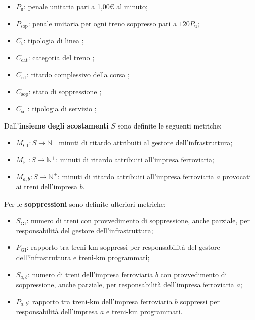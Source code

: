 \documentclass[12pt,italian]{report}
\begin{document}
\begin{itemize}
	\item $P_\text{u}$: penale unitaria pari a 1,00€ al minuto;
	\item $P_\text{sop}$: penale unitaria per ogni treno soppresso
    pari a $120 P_\text{u}$;
	\item $C_\text{t}$: tipologia di linea \cite[app.\ 5C, tabella
    1]{RfiPir};
	\item $C_\text{cat}$: categoria del treno \cite[app.\ 5C, tabella
    4]{RfiPir};
	\item $C_\text{rit}$: ritardo complessivo della corsa \cite[app.\
    5C, tabelle 2a, 2b, 2c]{RfiPir};
	\item $C_\text{sop}$: stato di soppressione \cite[app.\ 5C,
    tabella 6]{RfiPir};
	\item $C_\text{ser}$: tipologia di servizio \cite[app.\ 5C,
    tabella 3]{RfiPir};
\end{itemize}

Dall'\textbf{insieme degli scostamenti} $S$ sono definite le seguenti
metriche:

\begin{itemize}
	\item $M_\text{GI} : S \rightarrow \mathbb N^+$ minuti di ritardo
    attribuiti al gestore dell'infrastruttura;
	\item $M_\text{FI} : S \rightarrow \mathbb N^+$: minuti di ritardo
    attribuiti all'impresa ferroviaria;
	\item $M_{a, b} : S \rightarrow \mathbb N^+$: minuti di ritardo
    attribuiti all'impresa ferroviaria $a$ provocati ai treni
    dell'impresa $b$.
\end{itemize}

Per le \textbf{soppressioni} sono definite ulteriori metriche:
\begin{itemize}
	\item $S_\text{GI}$: numero di treni con provvedimento di
    soppressione, anche parziale, per responsabilità del gestore
    dell'infrastruttura;
	\item $P_\text{GI}$: rapporto tra treni-km soppressi per
    responsabilità del gestore dell'infrastruttura e treni-km
    programmati;
	\item $S_{a, b}$: numero di treni dell'impresa ferroviaria $b$ con
    provvedimento di soppressione, anche parziale, per responsabilità
    dell'impresa ferroviaria $a$;
	\item $P_{a, b}$: rapporto tra treni-km dell'impresa ferroviaria
    $b$ soppressi per responsabilità dell'impresa $a$ e treni-km
    programmati.
\end{itemize}
\end{document}
